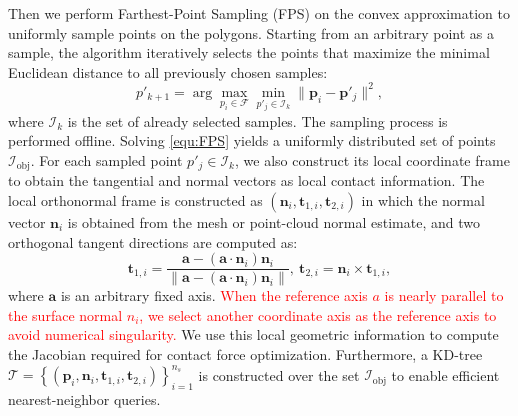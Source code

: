 Then we perform Farthest-Point Sampling (FPS) on the convex approximation to uniformly sample points on the polygons. Starting from an arbitrary point as a sample, the algorithm iteratively selects the points that maximize the minimal Euclidean distance to all previously chosen samples:
\begin{equation}
p'_{k+1} = \arg\max_{p_i \in \mathcal{F}} \min_{p'_j \in \mathcal{I}_{k}} \|\boldsymbol{p}_i - \boldsymbol{p}'_j\|^2, \label{equ:FPS}
\end{equation}
\noindent where $\mathcal{I}_{k}$ is the set of already selected samples. The sampling process is performed offline. Solving \eqref{equ:FPS} yields a uniformly distributed set of points $\mathcal{I}_{\text{obj}}$. For each sampled point $p'_j \in \mathcal{I}_{k}$, we also construct its local coordinate frame to obtain the tangential and normal vectors as local contact information. The local orthonormal frame is constructed as $(\boldsymbol{n}_i, \boldsymbol{t}_{1,i}, \boldsymbol{t}_{2,i})$ in which the normal vector $\boldsymbol{n}_i$ is obtained from the mesh or point-cloud normal estimate, and two orthogonal tangent directions are computed as:
\begingroup
\setlength{\abovedisplayskip}{5pt}
\setlength{\abovedisplayshortskip}{5pt}
\setlength{\belowdisplayskip}{4pt}
\setlength{\belowdisplayshortskip}{4pt}
\begin{equation}
\boldsymbol{t}_{1,i} =
\frac{\boldsymbol{a} - (\boldsymbol{a} \cdot \boldsymbol{n}_i)\boldsymbol{n}_i}
{\|\boldsymbol{a} - (\boldsymbol{a} \cdot \boldsymbol{n}_i)\boldsymbol{n}_i\|}, \
\boldsymbol{t}_{2,i} = \boldsymbol{n}_i \times \boldsymbol{t}_{1,i},
\end{equation}
\endgroup
\noindent where $\boldsymbol{a}$ is an arbitrary fixed axis. \textcolor{red}{When the reference axis $a$ is nearly parallel to the surface normal $n_i$, we select another coordinate axis as the reference axis to avoid numerical singularity.} We use this local geometric information to compute the Jacobian required for contact force optimization. Furthermore, a KD-tree $\mathcal{T}=\left \{ (\boldsymbol{p}_i,\boldsymbol{n}_i, \boldsymbol{t}_{1,i}, \boldsymbol{t}_{2,i}) \right \}^{n_s}_{i=1} $ is constructed over the set $\mathcal{I}_{\text{obj}}$ to enable efficient nearest-neighbor queries.

